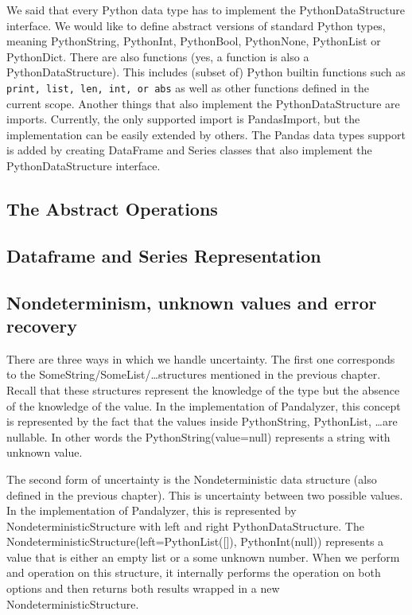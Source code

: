 We said that every Python data type has to implement the PythonDataStructure interface.
We would like to define abstract versions of standard Python types, meaning PythonString, PythonInt, PythonBool,
PythonNone, PythonList or PythonDict.
There are also functions (yes, a function is also a PythonDataStructure).
This includes (subset of) Python builtin functions such as \verb|print, list, len, int, or abs| as well as other
functions defined in the current scope.
Another things that also implement the PythonDataStructure are imports.
Currently, the only supported import is PandasImport, but the implementation can be easily extended by others.
The Pandas data types support is added by creating DataFrame and Series classes that also implement the PythonDataStructure
interface.

\subsection{The Abstract Operations}\label{subsec:the-abstract-operations}

\subsection{Dataframe and Series Representation}\label{subsec:dataframe-and-series-representation}

\subsection{Nondeterminism, unknown values and error recovery}\label{subsec:nondeterminism}

There are three ways in which we handle uncertainty.
The first one corresponds to the SomeString/SomeList/\ldots structures mentioned in the previous chapter.
Recall that these structures represent the knowledge of the type but the absence of the knowledge of the value.
In the implementation of Pandalyzer, this concept is represented by the fact that the values inside PythonString,
PythonList, \ldots are nullable.
In other words the PythonString(value=null) represents a string with unknown value.

The second form of uncertainty is the Nondeterministic data structure (also defined in the previous chapter).
This is uncertainty between two possible values.
In the implementation of Pandalyzer, this is represented by NondeterministicStructure with left and right
PythonDataStructure.
The NondeterministicStructure(left=PythonList([]), PythonInt(null)) represents a value that is either an empty list or a
some unknown number.
When we perform and operation on this structure, it internally performs the operation on both options and then
returns both results wrapped in a new NondeterministicStructure.

